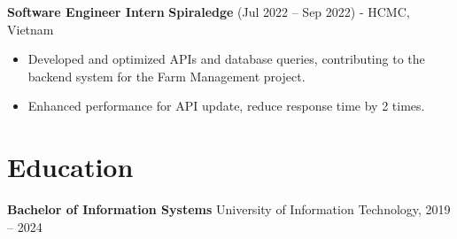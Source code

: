 \documentclass[11pt,a4paper]{article}
\begin{document}
\textbf{Software Engineer Intern} \hfill \textbf{Spiraledge} (Jul 2022 – Sep 2022) - HCMC, Vietnam  
\begin{itemize}[leftmargin=*]
    \item Developed and optimized APIs and database queries, contributing to the backend system for the Farm Management project.
    \item Enhanced performance for API update, reduce response time by 2 times.
\end{itemize}

\section*{Education}

\textbf{Bachelor of Information Systems} \hfill University of Information Technology, 2019 – 2024  
\end{document}
